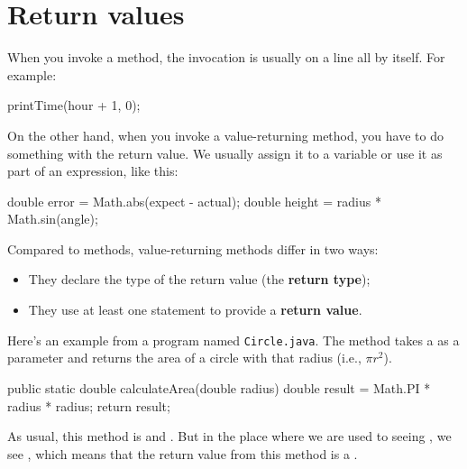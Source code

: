 \section{Return values}


When you invoke a  method, the invocation is usually on a line all by itself.
For example:

\begin{code}
printTime(hour + 1, 0);
\end{code}

On the other hand, when you invoke a value-returning method, you have to do something with the return value.
We usually assign it to a variable or use it as part of an expression, like this:

\begin{code}
double error = Math.abs(expect - actual);
double height = radius * Math.sin(angle);
\end{code}


Compared to  methods, value-returning methods differ in two ways:


\begin{itemize}

\item They declare the type of the return value (the {\bf return type});

\item They use at least one  statement to provide a {\bf return value}.

\end{itemize}

Here's an example from a program named {\tt Circle.java}.
The  method takes a  as a parameter and returns the area of a circle with that radius (i.e., $\pi r^2$).

\begin{code}
public static double calculateArea(double radius) {
    double result = Math.PI * radius * radius;
    return result;
}
\end{code}

As usual, this method is  and .
But in the place where we are used to seeing , we see , which means that the return value from this method is a .


